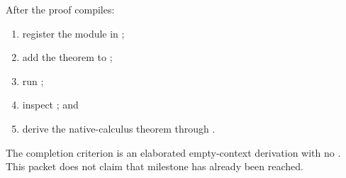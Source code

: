 After the proof compiles:
\begin{enumerate}[label=(\arabic*)]
\item register the module in ;
\item add the theorem to ;
\item run ;
\item inspect ; and
\item derive the native-calculus theorem through .
\end{enumerate}
The completion criterion is an elaborated empty-context derivation with no .  This packet does not claim that milestone has already been reached.
